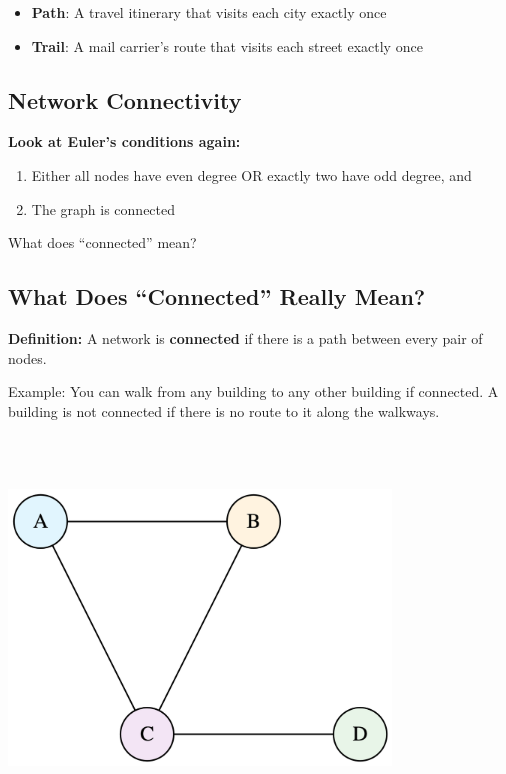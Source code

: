 \documentclass[
  letterpaper,
  DIV=11,
  numbers=noendperiod,
  oneside]{scrartcl}
\providecommand{\tightlist}{%
  \setlength{\itemsep}{0pt}\setlength{\parskip}{0pt}}
\begin{document}
\begin{itemize}
\tightlist
\item
  \textbf{Path}: A travel itinerary that visits each city exactly once
\item
  \textbf{Trail}: A mail carrier's route that visits each street exactly
  once
\end{itemize}

\subsection{Network Connectivity 🔗}\label{network-connectivity}

\textbf{Look at Euler's conditions again:}

\begin{enumerate}
\def\labelenumi{\arabic{enumi}.}
\tightlist
\item
  Either all nodes have even degree OR exactly two have odd degree, and
\item
  The graph is {connected}
\end{enumerate}

What does ``connected'' mean?

\subsection{What Does ``Connected'' Really Mean?
🤔}\label{what-does-connected-really-mean}

\textbf{Definition:} {A network is \textbf{connected}} if there is a
path between every pair of nodes.

Example: You can walk from any building to any other building if
connected. A building is not connected if there is no route to it along
the walkways.

\includegraphics[width=4in,height=4in]{slide01_files/figure-latex/dot-figure-4.png}
\end{document}
